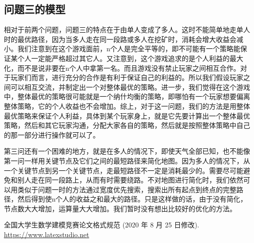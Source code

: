 \documentclass[withoutpreface,bwprint]{cumcmthesis} %
\begin{document}
\subsection{问题三的模型}
相对于前两个问题，问题三的特点在于由单人变成了多人。这时不能简单地走单人时的最优路径，因为当多人走在同一段路或多人在挖矿时，消耗会增大收益会减小。我们注意到在这个游戏面前，n个人是完全平等的，即不可能有一个策略能保证某个人一定能严格超过其它人。又注意到，这个游戏追求的是个人利益的最大化，而不是说非要在n个人中拿第一名。而且游戏没有禁止玩家之间相互合作。对于玩家们而言，进行充分的合作是有利于保证自己的利益的。所以我们假设玩家之间可以相互交流，并制定出一个对整体最优的策略。进一步，我们觉得在这个游戏中，整体最优的策略很可能就是一个纳什均衡的策略，即哪怕有一个玩家想要偏离整体策略，它的个人收益也不会增加。综上，对于这一问题，我们的方法是用整体最优策略来保证个人利益，具体到某个玩家身上，就是它先要计算出一个整体最优策略，然后和其它玩家沟通，分配大家各自的策略，然后就是按照整体策略中自己的那一部分进行操作就可以了。

第三问还有一个困难的地方，就是在多人的情况下，即使天气全部已知，也不能像第一问一样用关键节点及它们之间的最短路径来简化地图。因为多人的情况下，从一个关键节点到另一个关键节点，走最短路径不一定是消耗最少的。需要尽可能避免和别人走在同一段路上，从而有时需要绕路。不对地图进行简化时，我们依然可以用类似于问题一时的方法通过宽度优先搜索，搜索出所有起点到终点的完整路径，然后得到使n个人的收益之和最大的路径。只是这样做的话，由于没有简化，节点数大大增加，运算量大大增加。我们暂时没有想出比较好的优化的方法。



\begin{thebibliography}{9}%
    全国大学生数学建模竞赛论文格式规范 (2020 年 8 月 25 日修改).
     \url{https://www.latexstudio.net}
\end{thebibliography}
\end{document}
